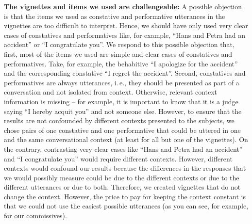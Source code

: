 \documentclass[egregdoesnotlikesansseriftitles,12pt]{scrartcl}
\begin{document}
\noindent\textbf{The vignettes and items we used are challengeable:} A possible objection is that the items we used as constative and performative utterances in the vignettes are too difficult to interpret. Hence, we should have only used very clear cases of constatives and performatives like, for example, ``Hans and Petra had an accident'' or ``I congratulate you''. We respond to this possible objection that, first, most of the items we used are simple and clear cases of constatives and performatives. Take, for example, the behabitive ``I apologize for the accident'' and the corresponding constative ``I regret the accident''. Second, constatives and performatives are always utterances, i.\,e., they should be presented as part of a conversation and not isolated from context. Otherwise, relevant context information is missing – for example, it is important to know that it is a judge saying ``I hereby acquit you'' and not someone else. However, to ensure that the results are not confounded by different contexts presented to the subjects, we chose pairs of one constative and one performative that could be uttered in one and the same conversational context (at least for all but one of the vignettes). On the contrary, contrasting very clear cases like ``Hans and Petra had an accident'' and ``I congratulate you'' would require different contexts. However, different contexts would confound our results because the differences in the responses that we would possibly measure could be due to the different contexts or due to the different utterances or due to both. Therefore, we created vignettes that do not change the context. However, the price to pay for keeping the context constant is that we could not use the easiest possible utterances (as you can see, for example, for our commissives).\\
\end{document}
